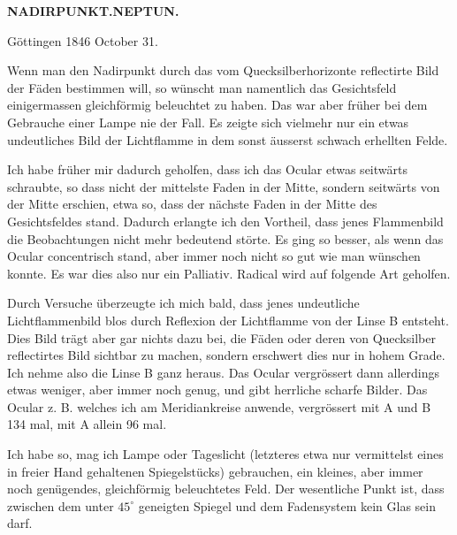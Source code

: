 \clearpage
\noindent{}%
%
\parbox[t]{\dimexpr\linewidth-24mm\relax}{\centering\footnotesize\bfseries NADIRPUNKT.\enspace NEPTUN.\par}%
\makebox[12mm][r]{}\par\nobreak\medskip
{}
\begin{flushright}Göttingen 1846 October 31.\end{flushright}

Wenn man den Nadirpunkt durch das vom Quecksilberhorizonte reflectirte Bild der Fäden bestimmen will, so wünscht man namentlich das Gesichtsfeld einigermassen gleichförmig beleuchtet zu haben. Das war aber früher bei dem Gebrauche einer Lampe nie der Fall. Es zeigte sich vielmehr nur ein etwas undeutliches Bild der Lichtflamme in dem sonst äusserst schwach erhellten Felde.

Ich habe früher mir dadurch geholfen, dass ich das Ocular etwas seitwärts schraubte, so dass nicht der mittelste Faden in der Mitte, sondern seitwärts von der Mitte erschien, etwa so, dass der nächste Faden in der Mitte des Gesichtsfeldes stand. Dadurch erlangte ich den Vortheil, dass jenes Flammenbild die Beobachtungen nicht mehr bedeutend störte. Es ging so besser, als wenn das Ocular concentrisch stand, aber immer noch nicht so gut wie man wünschen konnte. Es war dies also nur ein Palliativ. Radical wird auf folgende Art geholfen.

\begin{center}

\end{center}

Durch Versuche überzeugte ich mich bald, dass jenes undeutliche Lichtflammenbild blos durch Reflexion der Lichtflamme von der Linse B entsteht. Dies Bild trägt aber gar nichts dazu bei, die Fäden oder deren von Quecksilber reflectirtes Bild sichtbar zu machen, sondern erschwert dies nur in hohem Grade. Ich nehme also die Linse B ganz heraus. Das Ocular vergrössert dann allerdings etwas weniger, aber immer noch genug, und gibt herrliche scharfe Bilder. Das Ocular z. B. welches ich am Meridiankreise anwende, vergrössert mit A und B 134 mal, mit A allein 96 mal.

Ich habe so, mag ich Lampe oder Tageslicht (letzteres etwa nur vermittelst eines in freier Hand gehaltenen Spiegelstücks) gebrauchen, ein kleines, aber immer noch genügendes, gleichförmig beleuchtetes Feld. Der wesentliche Punkt ist, dass zwischen dem unter $45^\circ$ geneigten Spiegel und dem Fadensystem kein Glas sein darf.
